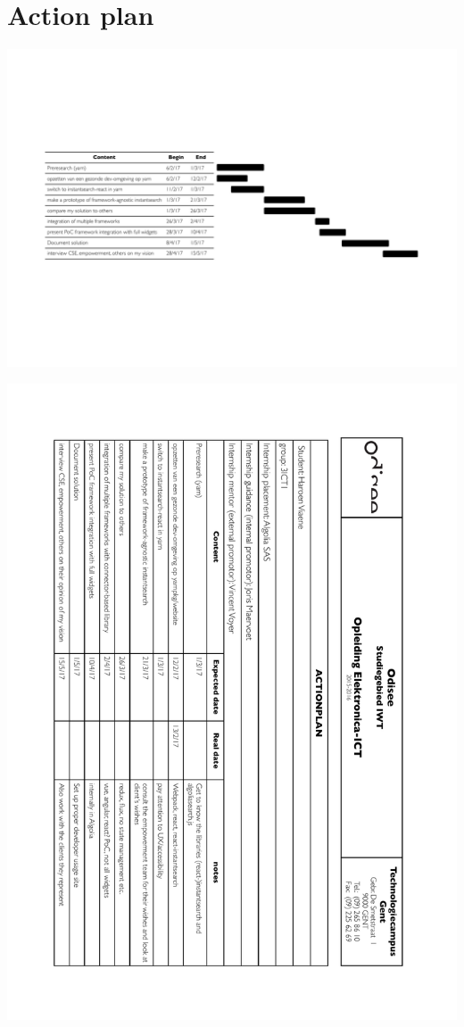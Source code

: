 
\chapter{Action plan}
\label{chp:action_plan}

\includegraphics[width=\textwidth]{../assets/action-plan-gantt.pdf}

\newpage

\includegraphics[width=\textwidth, height=0.95\textheight, keepaspectratio]{../assets/action-plan.pdf}

